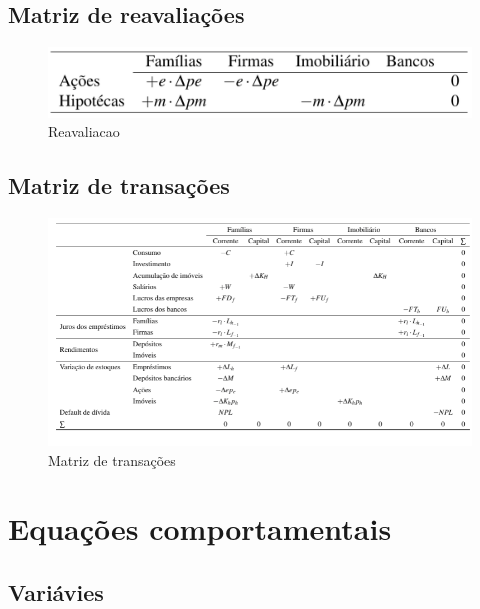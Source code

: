 \documentclass[11pt]{article}
\makeatletter
\def\maxwidth{\ifdim\Gin@nat@width>\linewidth\linewidth
    \else\Gin@nat@width\fi}
\let\Oldincludegraphics\includegraphics
\renewcommand{\includegraphics}[1]{\Oldincludegraphics[width=.8\maxwidth]{#1}}
\makeatother
\begin{document}
    \hypertarget{matriz-de-reavaliauxe7uxf5es}{%
\subsection{Matriz de reavaliações}\label{matriz-de-reavaliauxe7uxf5es}}

    \begin{figure}
\centering
\includegraphics{Reavaliacao.png}
\caption{Reavaliacao}
\end{figure}

    \hypertarget{matriz-de-transauxe7uxf5es}{%
\subsection{Matriz de transações}\label{matriz-de-transauxe7uxf5es}}

    \begin{figure}
\centering
\includegraphics{Transacao.png}
\caption{Matriz de transações}
\end{figure}

    \hypertarget{equauxe7uxf5es-comportamentais}{%
\section{Equações
comportamentais}\label{equauxe7uxf5es-comportamentais}}

    \hypertarget{variuxe1vies}{%
\subsection{Variávies}\label{variuxe1vies}}
\end{document}
